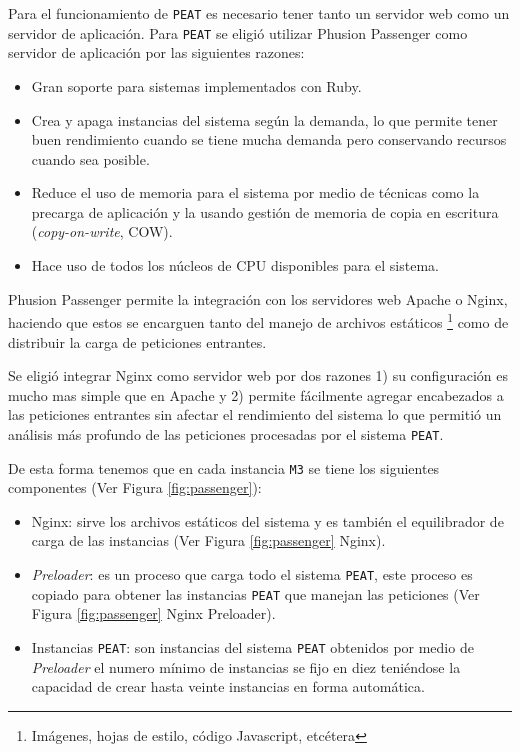 Para el funcionamiento de \texttt{PEAT} es necesario tener tanto un servidor web
como un servidor de aplicación.
Para \texttt{PEAT} se eligió utilizar Phusion Passenger como servidor de aplicación
por las siguientes razones:

\begin{itemize}
\item Gran soporte para sistemas implementados con Ruby.
\item Crea y apaga instancias del sistema según la demanda, lo que permite tener
  buen rendimiento cuando se tiene mucha demanda pero conservando recursos cuando
  sea posible.
\item Reduce el uso de memoria para el sistema por medio de técnicas como
  la precarga de aplicación y la usando gestión de memoria de copia en escritura
  (\textit{copy-on-write}, COW).
\item Hace uso de todos los núcleos de CPU disponibles para el sistema.
\end{itemize}

Phusion Passenger permite la integración con los servidores web Apache o Nginx,
haciendo que estos se encarguen tanto del manejo de archivos estáticos
\footnote{Imágenes, hojas de estilo, código Javascript, etcétera} como de distribuir
la carga de peticiones entrantes.

Se eligió integrar Nginx como servidor web por dos razones 1) su configuración es
mucho mas simple que en Apache y 2) permite fácilmente agregar encabezados a las
peticiones entrantes sin afectar el rendimiento del sistema lo que permitió un
análisis más profundo de las peticiones procesadas por el sistema \texttt{PEAT}.

De esta forma tenemos que en cada instancia \texttt{M3} se tiene los
siguientes componentes (Ver Figura \ref{fig:passenger}):
\begin{itemize}
\item Nginx: sirve los archivos estáticos del sistema y es también el
  equilibrador de carga de las instancias (Ver Figura \ref{fig:passenger} Nginx).
\item \textit{Preloader}: es un proceso que carga todo el sistema \texttt{PEAT},
  este proceso es copiado para obtener las instancias \texttt{PEAT} que manejan las
  peticiones (Ver Figura \ref{fig:passenger} Nginx Preloader).
\item Instancias \texttt{PEAT}: son instancias del sistema \texttt{PEAT} obtenidos
  por medio de \textit{Preloader} el numero mínimo de instancias se fijo en diez
  teniéndose la capacidad de crear hasta veinte instancias en forma automática.
\end{itemize}

